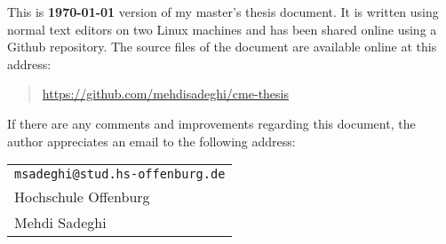 This is \textbf{\today} version of my master's thesis document. It is written using 
normal text editors on two Linux machines and has been shared 
online using a Github repository. The source files of the document are available 
online at this address:

%
\begin{quote}
\url{https://github.com/mehdisadeghi/cme-thesis}
\end{quote}
%

If there are any comments and improvements regarding this document, the author
appreciates an email to the following address:

\begin{center}
\begin{tabular}{l}
\nolinkurl{msadeghi@stud.hs-offenburg.de} \\
Hochschule Offenburg\\
Mehdi Sadeghi
\end{tabular}
\end{center}




